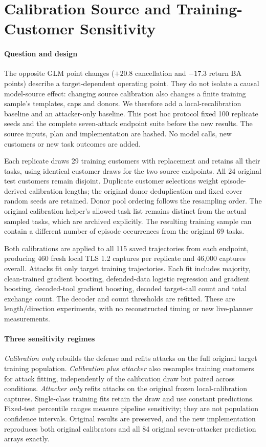 \section{Calibration Source and Training-Customer Sensitivity}\label{sec:calibration-stability}
\paragraph{Question and design}
The opposite GLM point changes ($+20.8$ cancellation and $-17.3$ return BA points) describe a target-dependent operating point. They do not isolate a causal model-source effect: changing source calibration also changes a finite training sample's templates, caps and donors. We therefore add a local-recalibration baseline and an attacker-only baseline. This post hoc protocol fixed 100 replicate seeds and the complete seven-attack endpoint suite before the new results. The source inputs, plan and implementation are hashed. No model calls, new customers or new task outcomes are added.

Each replicate draws 29 training customers with replacement and retains all their tasks, using identical customer draws for the two source endpoints. All 24 original test customers remain disjoint. Duplicate customer selections weight episode-derived calibration lengths; the original donor deduplication and fixed cover random seeds are retained. Donor pool ordering follows the resampling order. The original calibration helper's allowed-task list remains distinct from the actual sampled tasks, which are archived explicitly. The resulting training sample can contain a different number of episode occurrences from the original 69 tasks.

Both calibrations are applied to all 115 saved trajectories from each endpoint, producing 460 fresh local TLS 1.2 captures per replicate and 46,000 captures overall. Attacks fit only target training trajectories. Each fit includes majority, clean-trained gradient boosting, defended-data logistic regression and gradient boosting, decoded-tool gradient boosting, decoded target-call count and total exchange count. The decoder and count thresholds are refitted. These are length/direction experiments, with no reconstructed timing or new live-planner measurements.

\paragraph{Three sensitivity regimes}
\emph{Calibration only} rebuilds the defense and refits attacks on the full original target training population. \emph{Calibration plus attacker} also resamples training customers for attack fitting, independently of the calibration draw but paired across conditions. \emph{Attacker only} refits attacks on the original frozen local-calibration captures. Single-class training fits retain the draw and use constant predictions. Fixed-test percentile ranges measure pipeline sensitivity; they are not population confidence intervals. Original results are preserved, and the new implementation reproduces both original calibrators and all 84 original seven-attacker prediction arrays exactly.

